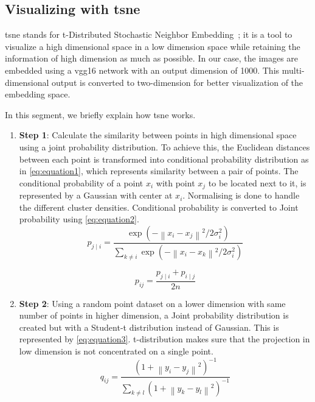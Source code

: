 \subsection{Visualizing with \gls{tsne}}\label{subsec:visualizing-with-tsne}
\gls{tsne} stands for t-Distributed Stochastic Neighbor Embedding~\cite{vanDerMaaten2008}; it is a tool to visualize a high dimensional space in a low dimension space while retaining the information of high dimension as much as possible.
In our case, the images are embedded using a \gls{vgg}16 network with an output dimension of 1000.
This multi-dimensional output is converted to two-dimension for better visualization of the embedding space.

In this segment, we briefly explain how \gls{tsne} works.

\begin{enumerate}
    \item \textbf{Step 1}: Calculate the similarity between points in high dimensional space using a joint probability distribution.
    To achieve this, the Euclidean distances between each point is transformed into conditional probability distribution as in \autoref{eq:equation1}, which represents similarity between a pair of points.
    The conditional probability of a point $x_i$ with point $x_j$ to be located next to it, is represented by a Gaussian with center at $x_i$.
    Normalising is done to handle the different cluster densities.
    Conditional probability is converted to Joint probability using \autoref{eq:equation2}.
    \begin{equation}
        p_{j \mid i}=\frac{\exp \left(-\left\|x_{i}-x_{j}\right\|^{2} / 2 \sigma_{i}^{2}\right)}{\sum_{k \neq i} \exp \left(-\left\|x_{i}-x_{k}\right\|^{2} / 2 \sigma_{i}^{2}\right)}
        \label{eq:equation1}
    \end{equation}

    \begin{equation}
        p_{i j}=\frac{p_{j \mid i}+p_{i \mid j}}{2 n}
        \label{eq:equation2}
    \end{equation}

    \item \textbf{Step 2}: Using a random point dataset on a lower dimension with same number of points in higher dimension, a Joint probability distribution is created but with a Student-t distribution instead of Gaussian.
    This is represented by \autoref{eq:equation3}.
    t-distribution makes sure that the projection in low dimension is not concentrated on a single point.
    \begin{equation}
        q_{ij} = \frac{(1+\left \| y_{i}-y_{j} \right \|^{2})^{-1}}{\sum _{k\neq l} (1+\left \| y_{k}-y_{l} \right \|^{2})^{-1}}
        \label{eq:equation3}
    \end{equation}


\end{enumerate}
